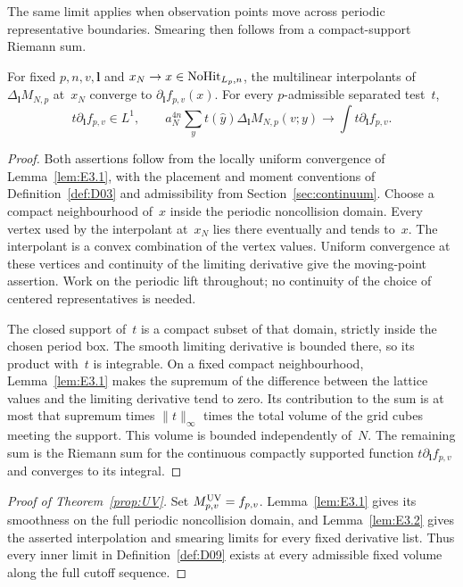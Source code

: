 The same limit applies when observation points move across periodic representative boundaries. Smearing then follows from a compact-support Riemann sum.
\begin{lemma}\label{lem:E3.2}
For fixed $p,n,v,\boldsymbol l$ and $x_N\to x\in\mathrm{NoHit}_{L_p,n}$, the multilinear interpolants of $\Delta_{\boldsymbol l}M_{N,p}$ at~$x_N$ converge to $\partial_{\boldsymbol l}f_{p,v}(x)$. For every $p$-admissible separated test~$t$,
\begin{equation*}
t\partial_{\boldsymbol l}f_{p,v}\in L^1,\qquad
 a_N^{4n}\sum_y t(\hat y)\Delta_{\boldsymbol l}M_{N,p}(v;y)
\longrightarrow\int t\partial_{\boldsymbol l}f_{p,v}.
\end{equation*}
\end{lemma}
\begin{proof}
Both assertions follow from the locally uniform convergence of Lemma~\ref{lem:E3.1}, with the placement and moment conventions of Definition~\ref{def:D03} and admissibility from Section~\ref{sec:continuum}. Choose a compact neighbourhood of~$x$ inside the periodic noncollision domain. Every vertex used by the interpolant at~$x_N$ lies there eventually and tends to~$x$. The interpolant is a convex combination of the vertex values. Uniform convergence at these vertices and continuity of the limiting derivative give the moving-point assertion. Work on the periodic lift throughout; no continuity of the choice of centered representatives is needed.

The closed support of~$t$ is a compact subset of that domain, strictly inside the chosen period box. The smooth limiting derivative is bounded there, so its product with~$t$ is integrable. On a fixed compact neighbourhood, Lemma~\ref{lem:E3.1} makes the supremum of the difference between the lattice values and the limiting derivative tend to zero. Its contribution to the sum is at most that supremum times $\|t\|_\infty$ times the total volume of the grid cubes meeting the support. This volume is bounded independently of~$N$. The remaining sum is the Riemann sum for the continuous compactly supported function $t\partial_{\boldsymbol l}f_{p,v}$ and converges to its integral.
\end{proof}

\begin{proof}[Proof of Theorem~\ref{prop:UV}]
Set $M^{\rm UV}_{p,v}=f_{p,v}$. Lemma~\ref{lem:E3.1} gives its smoothness on the full periodic noncollision domain, and Lemma~\ref{lem:E3.2} gives the asserted interpolation and smearing limits for every fixed derivative list. Thus every inner limit in Definition~\ref{def:D09} exists at every admissible fixed volume along the full cutoff sequence.
\end{proof}
